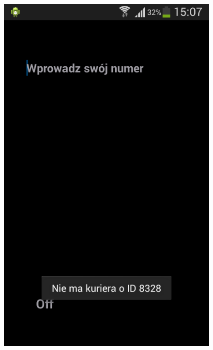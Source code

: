 \documentclass[eng,printmode,oneside]{mgr}
\begin{document}
\begin{figure}
{\includegraphics[height=0.35\textheight]{andNiema.png}
\label{fig:androidViewNOTOK}
}
\end{figure}
\end{document}
